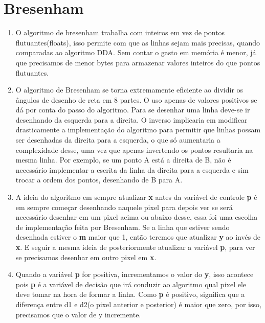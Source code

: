 \section*{Bresenham}

	\begin{enumerate}\addtocounter{enumi}{10}
	
		\item O algoritmo de bresenham trabalha com inteiros em vez de pontos flutuantes(floats),
		isso permite com que as linhas sejam mais precisas, quando comparadas ao algoritmo DDA.
		Sem contar o gasto em memória é menor, já que precisamos de menor bytes para armazenar 	       valores inteiros do que pontos flutuantes.
		
		\item 
O algoritmo de Bresenham se torna extremamente eficiente ao dividir os ângulos de
desenho de reta em 8 partes. O uso apenas de valores positivos se dá por conta do passo do
algoritmo. Para se desenhar uma linha deve-se ir desenhando da esquerda para a
direita. O inverso implicaria em modificar drasticamente a implementação do algoritmo para
permitir que linhas possam ser desenhadas da direita para a esquerda, o que só aumentaria a
complexidade desse, uma vez que apenas invertendo os pontos resultaria na mesma linha. Por
exemplo, se um ponto A está a direita de B, não é necessário implementar a escrita da linha da
direita para a esquerda e sim trocar a ordem dos pontos, desenhando de B para A.

		\item 
A ideia do algoritmo em sempre atualizar \textbf{x} antes da variável de controle \textbf{p} é em
sempre começar desenhando naquele pixel para depois ver se será necessário desenhar em um pixel acima ou abaixo desse, essa foi uma escolha de implementação feita por Bresenham. Se a linha que estiver sendo desenhada estiver o \textbf{m} maior que 1, então teremos que atualizar \textbf{y} ao invés de \textbf{x}. E seguir a mesma ideia de posteriormente atualizar a variável  \textbf{p}, para ver se precisamos desenhar em outro pixel em \textbf{x}.

		\item 
		Quando a variável \textbf{p} for positiva, incrementamos o valor do \textbf{y},
		isso acontece pois \textbf{p} é a variável de decisão que irá conduzir ao algoritmo
		qual pixel ele deve tomar na hora de formar a linha. Como \textbf{p} é positivo, 
		significa que a diferença entre d1 e d2(o pixel anterior e posterior) é maior que zero,
		por isso, precisamos que o valor de y incremente.


\end{enumerate}
